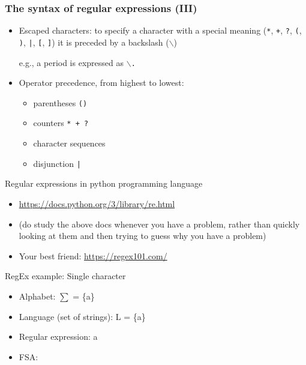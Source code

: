\documentclass{beamer}
\def\dx{1cm} \def\dy{1.5cm}
\newcommand{\newState}[4]{\node[state,#3](#1)[#4]{#2};}
\newcommand{\newTransition}[4]{\path[->] (#1) edge [#4] node {#3} (#2);}
\begin{document}
\begin{frame}
\frametitle{The syntax of regular expressions (III)}

\begin{itemize}
\item Escaped characters: to specify a character with a special
  meaning (\texttt{*}, \texttt{+}, \texttt{?}, \texttt{(}, \texttt{)},
  \texttt{|}, \texttt{[}, \texttt{]}) it is preceded by a backslash
  (\texttt{$\backslash$})

  e.g., a period is expressed as \texttt{$\backslash$.}

\item Operator precedence, from highest to lowest:
\begin{itemize}
\item[] parentheses \texttt{()}
\item[] counters \texttt{* + ?}
\item[] character sequences
\item[] disjunction \texttt{|}
\end{itemize}
\end{itemize}
\end{frame}


\begin{frame}{Regular expressions in python programming language}
  \begin{itemize}
  \item \url{https://docs.python.org/3/library/re.html} 
    
  \item (do study the above docs whenever you have a problem, rather
    than quickly looking at them and then trying to guess why you have a
    problem)
  \item Your best friend: \url{https://regex101.com/}
  \end{itemize}
\end{frame}


\begin{frame}[t]{RegEx example: Single character}
  \begin{itemize}
  \item Alphabet: $\sum$ = \{a\}
  \item Language (set of strings): L = \{a\}
  \item Regular expression: a
  \item FSA:
  \end{itemize}

  \pause

  \begin{center}
    \end{center}
\end{frame}
\end{document}
